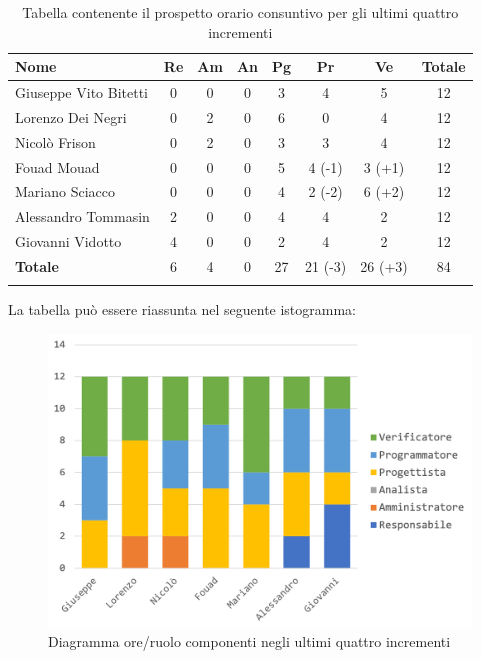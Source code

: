 			\begin{longtable}{|l|c|c|c|c|c|c|c|}
				\hline
				\rowcolor{lighter-grayer}
				\textbf{Nome} & \textbf{Re} & \textbf{Am} & \textbf{An} & \textbf{Pg}  & \textbf{Pr}   & \textbf{Ve} & \textbf{Totale} \\
				\hline
				\endfirsthead
				
				\hline
				Giuseppe Vito Bitetti 		 & 0 & 0 & 0 & 3 & 4 & 5  & 12\\
				\hline
				\hline
				Lorenzo Dei Negri			 & 0 & 2 & 0 & 6 & 0 & 4 & 12\\
				\hline
				\hline
				Nicolò Frison				    & 0 & 2  & 0 & 3  & 3 & 4 & 12\\
				\hline
				\hline
				Fouad Mouad 				 & 0 & 0 & 0 & 5 & 4 (-1) & 3 (+1) & 12\\
				\hline
				\hline
				Mariano Sciacco 			 & 0 & 0 & 0 & 4 & 2 (-2) & 6 (+2) & 12\\
				\hline
				\hline
				Alessandro Tommasin     & 2 & 0 & 0 & 4 & 4 & 2 & 12\\
				\hline
				\hline
				Giovanni Vidotto 			 & 4 & 0 & 0 & 2 & 4 & 2 & 12\\
				\hline 
				\textbf{Totale}			 		& 6 & 4 & 0 & 27 & 21 (-3) & 26 (+3) & 84\\
				\hline
				\caption{Tabella contenente il prospetto orario consuntivo per gli ultimi quattro incrementi}
			\end{longtable}
			\pagebreak
			
			La tabella può essere riassunta nel seguente istogramma:
			\begin{figure}[H]
				\centering
				\includegraphics[width=0.8\linewidth]{./images/consuntivo/ConsIncr9-12-1.png}
				\caption{Diagramma ore/ruolo componenti negli ultimi quattro incrementi}
				\label{fig:diagramma suddivione ruoli incrementi IX-XII}
			\end{figure}
			
